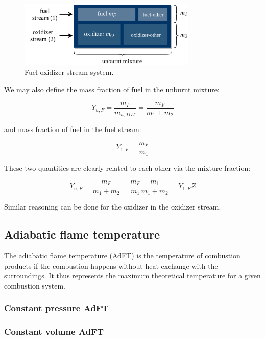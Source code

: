\documentclass[10pt,twocolumn]{article}
\begin{document}
\begin{figure}[H]
\centering\includegraphics[width=8.5cm]{mixture-fraction.png}
\caption{Fuel-oxidizer stream system.}			
\label{fig:mixture-fraction}
\end{figure}

We may also define the mass fraction of fuel in the unburnt mixture:

\begin{equation}
Y_{u, F} = \frac{m_F}{m_{u, TOT}} = \frac{m_F}{m_1 + m_2}
\end{equation}

and mass fraction of fuel in the fuel stream:

\begin{equation}
Y_{1, F} = \frac{m_F}{m_1}
\end{equation}

These two quantities are clearly related to each other via the mixture fraction:

\begin{equation}
Y_{u, F} = \frac{m_F}{m_1 + m_2} = \frac{m_F}{m_1} \frac{m_1}{m_1 + m_2} = Y_{1, F} Z
\end{equation}

Similar reasoning can be done for the oxidizer in the oxidizer stream.

\subsection{Adiabatic flame temperature}

The adiabatic flame temperature (AdFT) is the temperature of combustion products if the combustion happens without heat exchange with the surroundings. It thus represents the maximum theoretical temperature for a given combustion system.

\subsubsection{Constant pressure AdFT}



\subsubsection{Constant volume AdFT}
\end{document}

